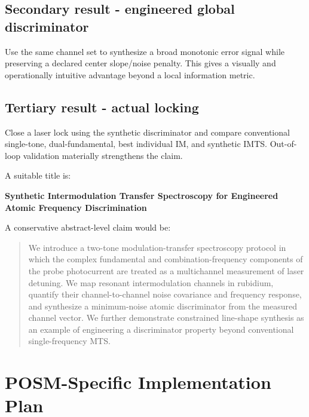\documentclass[10pt]{article}
\begin{document}
\subsection*{Secondary result - engineered global discriminator}
Use the same channel set to synthesize a broad monotonic error signal while preserving a declared center slope/noise penalty. This gives a visually and operationally intuitive advantage beyond a local information metric.

\subsection*{Tertiary result - actual locking}
Close a laser lock using the synthetic discriminator and compare conventional single-tone, dual-fundamental, best individual IM, and synthetic IMTS. Out-of-loop validation materially strengthens the claim.

A suitable title is:
\begin{center}
\textbf{Synthetic Intermodulation Transfer Spectroscopy for Engineered Atomic Frequency Discrimination}
\end{center}

A conservative abstract-level claim would be:

\begin{quote}
We introduce a two-tone modulation-transfer spectroscopy protocol in which the complex fundamental and combination-frequency components of the probe photocurrent are treated as a multichannel measurement of laser detuning. We map resonant intermodulation channels in rubidium, quantify their channel-to-channel noise covariance and frequency response, and synthesize a minimum-noise atomic discriminator from the measured channel vector. We further demonstrate constrained line-shape synthesis as an example of engineering a discriminator property beyond conventional single-frequency MTS.
\end{quote}

\section{POSM-Specific Implementation Plan}
\end{document}
